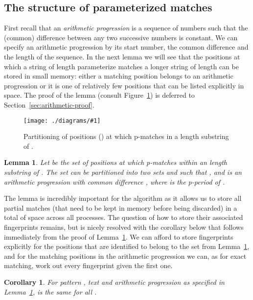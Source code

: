 \documentclass[11pt,a4paper]{article}
\theoremstyle{theorem}
\newtheorem{lemma}[theorem]{Lemma}
\newtheorem{corollary}[theorem]{Corollary}
\newcommand{\pmatches}{\mbox{p-matches}\xspace}
\newcommand{\pperiod}{\mbox{p-period}\xspace}
\newcommand{\insertdiagram}[1]{
    \centering
    \texttt{[image: ./diagrams/\#1]}}
\newcommand{\insertfigure}[2]{
    \begin{figure}[t]
        \centering
        \insertdiagram{#1}
        \caption{#2}
    \end{figure}
    }
\begin{document}
\subsection{The structure of parameterized matches}
First recall that an \emph{arithmetic progression} is a sequence of numbers such that the (common) difference between any two successive numbers is constant. We can specify an arithmetic progression by its start number, the common difference and the length of the sequence.
In the next lemma we will see that the positions at which a string  of length  parameterize matches a longer string of length  can be stored in small memory: either a matching position belongs to an arithmetic progression or it is one of relatively few positions that can be listed explicitly in  space.
The proof of the lemma (consult Figure~\ref{fig:typ-matches}) is deferred to Section~\ref{sec:arithmetic-proof}.

\insertfigure{typ-matches}{\label{fig:typ-matches} Partitioning of positions (\!{\Large}\!) at which  \pmatches in a  length substring of .}

\begin{lemma}
    \label{lem:arithmetic}
     Let  be the set of positions at which  \pmatches within an  length substring of . The set  can be partitioned into two sets  and  such that ,  and  is an arithmetic progression with common difference , where  is the \pperiod of .
\end{lemma}

The lemma is incredibly important for the algorithm as it allows us to store all partial matches (that need to be kept in memory before being discarded) in a total of  space across all processes. The question of how to store their associated fingerprints remains, but is nicely resolved with the corollary below that follows immediately from the proof of Lemma~\ref{lem:arithmetic}. We can afford to store fingerprints explicitly for the positions that are identified to belong to the set  from Lemma~\ref{lem:arithmetic}, and for the matching positions in the arithmetic progression  we can, as for exact matching, work out every fingerprint given the first one.

\begin{corollary}
    \label{cor:arithmetic}
     For pattern , text  and arithmetic progression  as specified in Lemma~\ref{lem:arithmetic},  is the same for all .

\end{corollary}
\end{document}
